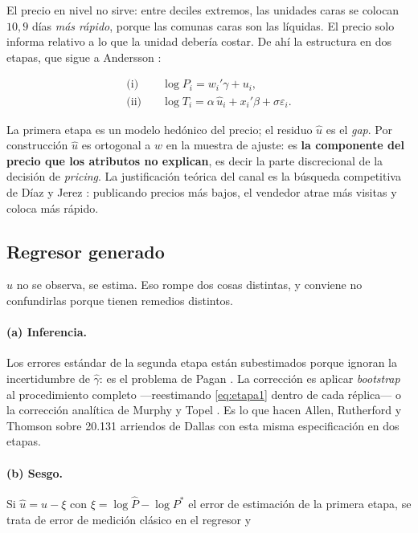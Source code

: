 \documentclass[11pt,a4paper]{article}
\theoremstyle{definition}
\begin{document}
El precio en nivel no sirve: entre deciles extremos, las unidades caras se
colocan $10{,}9$ días \emph{más rápido}, porque las comunas caras son las
líquidas. El precio solo informa relativo a lo que la unidad debería costar. De
ahí la estructura en dos etapas, que sigue a Andersson \cite{andersson2025}:

\begin{align}
\text{(i)}\quad & \log P_i = w_i'\gamma + u_i, \label{eq:etapa1}\\
\text{(ii)}\quad & \log T_i = \alpha\,\hat{u}_i + x_i'\beta + \sigma\varepsilon_i.
\label{eq:etapa2}
\end{align}

La primera etapa es un modelo hedónico del precio; el residuo $\hat{u}$ es el
\emph{gap}. Por construcción $\hat{u}$ es ortogonal a $w$ en la muestra de
ajuste: es \textbf{la componente del precio que los atributos no explican}, es
decir la parte discrecional de la decisión de \emph{pricing}. La justificación
teórica del canal es la búsqueda competitiva de Díaz y Jerez \cite{diazjerez2010}:
publicando precios más bajos, el vendedor atrae más visitas y coloca más rápido.

\subsection{Regresor generado}

$\hat{u}$ no se observa, se estima. Eso rompe dos cosas distintas, y conviene no
confundirlas porque tienen remedios distintos.

\paragraph{(a) Inferencia.} Los errores estándar de la segunda etapa están
subestimados porque ignoran la incertidumbre de $\hat{\gamma}$: es el problema de
Pagan \cite{pagan1984}. La corrección es aplicar \emph{bootstrap} al procedimiento
completo ---reestimando \eqref{eq:etapa1} dentro de cada réplica--- o la corrección
analítica de Murphy y Topel \cite{murphytopel1985}. Es lo que hacen Allen,
Rutherford y Thomson \cite{allen2009} sobre 20.131 arriendos de Dallas con esta
misma especificación en dos etapas.

\paragraph{(b) Sesgo.} Si $\hat{u}=u-\xi$ con $\xi=\log\hat{P}-\log P^{*}$ el error
de estimación de la primera etapa, se trata de error de medición clásico en el
regresor y
\end{document}
